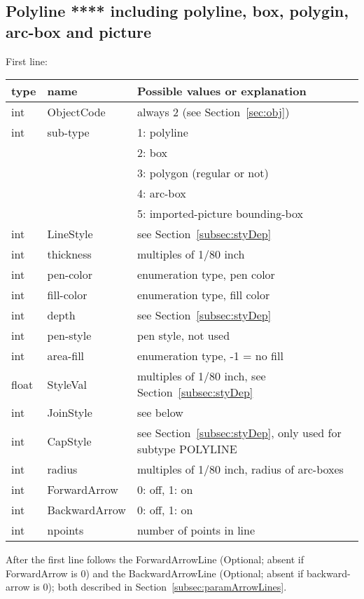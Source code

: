 \documentclass[10pt, a4paper]{article}
\begin{document}
\subsection{Polyline ****  including polyline, box, polygin, arc-box and picture }
\label{subsec:polyline}

    First line:

\begin{tabular}{|lll|}
\hline
type & name & Possible values or explanation \\
\hline
\hline
int    & ObjectCode    & always 2 (see Section~\ref{sec:obj}) \\
int    & sub-type       & 1: polyline \\
&&                        2: box \\
&&                        3: polygon (regular or not) \\
&&                        4: arc-box \\
&&                        5: imported-picture bounding-box \\
int    & LineStyle     & see Section~\ref{subsec:styDep} \\
int    & thickness      & multiples of 1/80 inch \\
int    & pen-color      & enumeration type, pen color \\
int    & fill-color     & enumeration type, fill color \\
int    & depth          & see Section~\ref{subsec:styDep} \\
int    & pen-style      & pen style, not used \\
int    & area-fill      & enumeration type, -1 = no fill \\%
float  & StyleVal      & multiples of 1/80 inch, see Section~\ref{subsec:styDep} \\
int    & JoinStyle     & see below \\
int    & CapStyle      & see Section~\ref{subsec:styDep}, only used for subtype POLYLINE \\
int    & radius         & multiples of 1/80 inch, radius of arc-boxes \\
int    & ForwardArrow  & 0: off, 1: on \\
int    & BackwardArrow & 0: off, 1: on \\
int    & npoints        & number of points in line \\
\hline
\end{tabular}

After the first line follows the ForwardArrowLine 
(Optional; absent if ForwardArrow is 0) and 
the BackwardArrowLine (Optional; absent if backward-arrow is 0); 
both described in Section~\ref{subsec:paramArrowLines}. 
\end{document}
